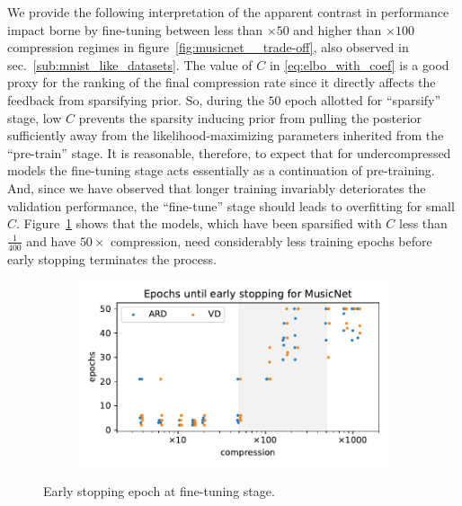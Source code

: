 \documentclass[a4paper,10pt,twocolumn]{article}
\begin{document}

We provide the following interpretation of the apparent contrast in performance impact
borne by fine-tuning between less than $\times50$ and higher than $\times100$ compression
regimes in figure~\ref{fig:musicnet__trade-off}, also observed in sec.~\ref{sub:mnist_like_datasets}.
%
The value of $C$ in \eqref{eq:elbo_with_coef} is a good proxy for the ranking of the
final compression rate since it directly affects the feedback from sparsifying prior.
So, during the $50$ epoch allotted for ``sparsify'' stage, low $C$ prevents the sparsity
inducing prior from pulling the posterior sufficiently away from the likelihood-maximizing
parameters inherited from the ``pre-train'' stage. It is reasonable, therefore, to expect
that for undercompressed models the fine-tuning stage acts essentially as a continuation
of pre-training. And, since we have observed that longer training invariably deteriorates
the validation performance, the ``fine-tune'' stage should leads to overfitting for small
$C$.
%
Figure~\ref{fig:musicnet__early_stopping} shows that the models, which have been
sparsified with $C$ less than $\tfrac1{400}$ and have $50\times$ compression, need
considerably less training epochs before early stopping terminates the process.

\begin{figure}[!t]
  \centering
  \begin{subfigure}[b]{1.\columnwidth}  %
    \centering
    \includegraphics[width=\columnwidth]{figure__fine-tune_fx__early__compression.pdf}
  \end{subfigure}
  \caption{%
    Early stopping epoch at fine-tuning stage.
  }
  \label{fig:musicnet__early_stopping}
\end{figure}
\end{document}
